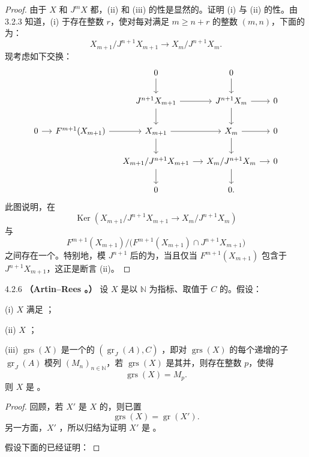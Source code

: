 \begin{proof}由于 $X$ 和 $J^mX$ 都，(ii) 和 (iii) 的性是显然的。证明 (i) 与 (ii) 的性。由 3.2.3 知道，(i) 于存在整数 $r$，使对每对满足 $m\geq n+r$ 的整数 $(m,n)$，下面的为：
\[
X_{m+1}/J^{n+1}X_{m+1}\longrightarrow X_m/J^{n+1}X_m.
\]
现考虑如下交换：
\[
\begin{tikzcd}[column sep=small]
&&0\arrow[d]&0\arrow[d]\\
&&J^{n+1}X_{m+1}\arrow[r]\arrow[d]&J^{n+1}X_m\arrow[r]\arrow[d]&0\\
0\arrow[r]&F^{m+1}(X_{m+1})\arrow[r]&X_{m+1}\arrow[r]\arrow[d]&X_m\arrow[r]\arrow[d]&0\\
&&X_{m+1}/J^{n+1}X_{m+1}\arrow[r]\arrow[d]&X_m/J^{n+1}X_m\arrow[r]\arrow[d]&0\\
&&0&0.
\end{tikzcd}
\]
此图说明，在
\[
\operatorname{Ker}(X_{m+1}/J^{n+1}X_{m+1}\longrightarrow X_m/J^{n+1}X_m)
\]
与
\[
F^{m+1}(X_{m+1})/\bigl(F^{m+1}(X_{m+1})\cap J^{n+1}X_{m+1}\bigr)
\]
之间存在一个。特别地，模 $J^{n+1}$ 后的为，当且仅当 $F^{m+1}(X_{m+1})$ 包含于 $J^{n+1}X_{m+1}$，这正是断言 (ii)。
\end{proof}
\begin{SGAresult}{}{4.2.6}
\textbf{（Artin--Rees 。）} 设 $X$ 是以 $\mathbb N$ 为指标、取值于 $C$ 的。假设：

(i) $X$ 满足 ；

(ii) $X$ ；

(iii) $\operatorname{grs}(X)$ 是一个的 $(\operatorname{gr}_J(A),C)$ ，即对 $\operatorname{grs}(X)$ 的每个递增的子 $\operatorname{gr}_J(A)$ 模列 $(M_n)_{n\in\mathbb N}$，若 $\operatorname{grs}(X)$ 是其并，则存在整数 $p$，使得
\[
\operatorname{grs}(X)=M_p.
\]
则 $X$ 是 。
\end{SGAresult}
\begin{proof}回顾，若 $X'$ 是 $X$ 的，则已置
\[
\operatorname{grs}(X)=\operatorname{gr}(X').
\]
另一方面，$X'$ ，所以归结为证明 $X'$ 是 。

假设下面的已经证明：
\end{proof}
